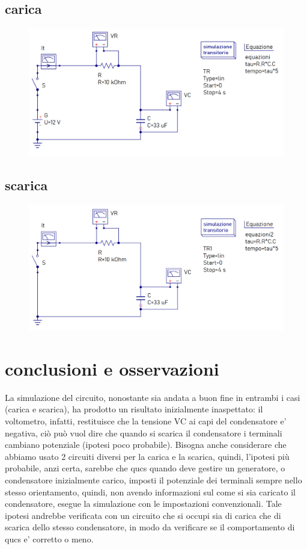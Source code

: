 \documentclass[12pt]{article}
\begin{document}
\subsection*{carica}

\begin{figure}[!h]
  \includegraphics[width=0.9\linewidth]{data/carica-simulazione-qucs.png}
\end{figure}

\subsection*{scarica}

\begin{figure}[!h]
  \includegraphics[width=0.9\linewidth]{data/scarica-simulazione-qucs.png}
\end{figure}

\newpage

\section*{conclusioni e osservazioni}
La simulazione del circuito, nonostante sia andata a buon fine in entrambi i casi (carica e scarica), ha prodotto un risultato inizialmente inaspettato: il voltometro, infatti, restituisce che la tensione VC ai capi del condensatore e' negativa, ciò può vuol dire che quando si scarica il condensatore i terminali cambiano potenziale (ipotesi poco probabile).
Bisogna anche considerare che abbiamo usato 2 circuiti diversi per la carica e la scarica, quindi, l'ipotesi più probabile, anzi certa, sarebbe che qucs quando deve gestire un generatore, o condensatore inizialmente carico, imposti il potenziale dei terminali sempre nello stesso orientamento, quindi, non avendo informazioni sul come si sia caricato il condensatore, esegue la simulazione con le impostazioni convenzionali. Tale ipotesi andrebbe verificata con un circuito che si occupi sia di carica che di scarica dello stesso condensatore, in modo da verificare se il comportamento di qucs e' corretto o meno.
\end{document}
